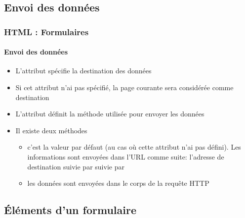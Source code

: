 \documentclass[xcolor=table]{beamer}
\begin{document}
\subsection{Envoi des données}

\begin{frame}[fragile]
\frametitle{HTML : Formulaires}
\framesubtitle{Envoi des données}

\begin{itemize}
	\item L'attribut  spécifie la destination des données
	\item Si cet attribut n'ai pas spécifié, la page courante sera considérée comme destination
	\item L'attribut  définit la méthode  utilisée pour envoyer les données
	\item Il existe deux méthodes 
	\begin{itemize}
		\item {} c'est la valeur par défaut (au cas où cette attribut n'ai pas défini). 
		Les informations sont envoyées dans l'URL comme suite: 
		l'adresse de destination suivie par  suivie par 
		\item {} les données sont envoyées dans le corps de la requête HTTP
	\end{itemize}
\end{itemize}

\end{frame}

\subsection{Éléments d'un formulaire}
\end{document}
